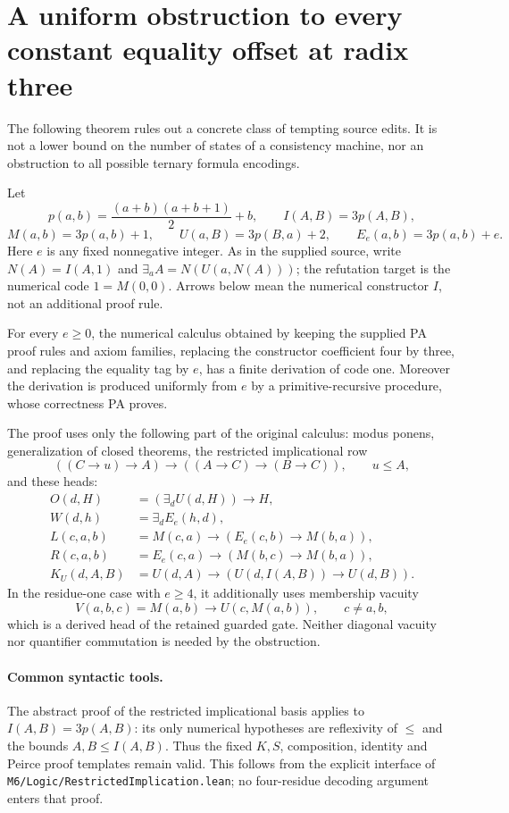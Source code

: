 \section{A uniform obstruction to every constant equality offset at radix three}
\label{sec:radix-three-no-go}

The following theorem rules out a concrete class of tempting source edits.
It is not a lower bound on the number of states of a consistency machine,
nor an obstruction to all possible ternary formula encodings.

Let
\[
 p(a,b)=\frac{(a+b)(a+b+1)}2+b,
 \qquad I(A,B)=3p(A,B),
\]
\[
 M(a,b)=3p(a,b)+1,\qquad U(a,B)=3p(B,a)+2,
 \qquad E_e(a,b)=3p(a,b)+e.
\]
Here $e$ is any fixed nonnegative integer. As in the supplied source,
write $N(A)=I(A,1)$ and $\exists_a A=N(U(a,N(A)))$; the refutation target
is the numerical code $1=M(0,0)$. Arrows below mean the numerical
constructor $I$, not an additional proof rule.

\begin{theorem}
\label{thm:all-offsets}
For every $e\ge0$, the numerical calculus obtained by keeping the supplied
PA proof rules and axiom families, replacing the constructor coefficient
four by three, and replacing the equality tag by $e$, has a finite
derivation of code one. Moreover the derivation is produced uniformly
from $e$ by a primitive-recursive procedure, whose correctness PA proves.
\end{theorem}

The proof uses only the following part of the original calculus:
modus ponens, generalization of closed theorems, the restricted
implicational row
\[
 ((C\to u)\to A)\to((A\to C)\to(B\to C)),\qquad u\le A,
\]
and these heads:
\begin{align*}
 O(d,H)&=(\exists_d U(d,H))\to H,\\
 W(d,h)&=\exists_d E_e(h,d),\\
 L(c,a,b)&=M(c,a)\to(E_e(c,b)\to M(b,a)),\\
 R(c,a,b)&=E_e(c,a)\to(M(b,c)\to M(b,a)),\\
 K_U(d,A,B)&=U(d,A)\to(U(d,I(A,B))\to U(d,B)).
\end{align*}
In the residue-one case with $e\ge4$, it additionally uses membership
vacuity
\[
 V(a,b,c)=M(a,b)\to U(c,M(a,b)),\qquad c\ne a,b,
\]
which is a derived head of the retained guarded gate. Neither diagonal
vacuity nor quantifier commutation is needed by the obstruction.

\paragraph{Common syntactic tools.}
The abstract proof of the restricted implicational basis applies to
$I(A,B)=3p(A,B)$: its only numerical hypotheses are reflexivity of
$\le$ and the bounds $A,B\le I(A,B)$. Thus the fixed $K,S$, composition,
identity and Peirce proof templates remain valid. This follows from the
explicit interface of
\texttt{M6/Logic/RestrictedImplication.lean}; no four-residue decoding
argument enters that proof.

